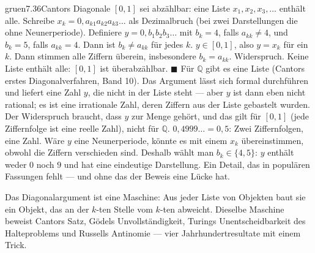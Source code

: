 \begin{loesungkarte}{gruen}{7.36}{Cantors Diagonale}
$[0, 1]$ sei abzählbar: eine Liste $x_1, x_2, x_3, \dots$ enthält alle. Schreibe $x_k = 0{,}a_{k1}a_{k2}a_{k3}\dots$ als Dezimalbruch (bei zwei Darstellungen die ohne Neunerperiode).
Definiere $y = 0{,}b_1b_2b_3\dots$ mit $b_k = 4$, falls $a_{kk}\neq4$, und $b_k = 5$, falls $a_{kk} = 4$. Dann ist $b_k\neq a_{kk}$ für jedes $k$.
$y\in[0, 1]$, also $y = x_k$ für ein $k$. Dann stimmen alle Ziffern überein, insbesondere $b_k = a_{kk}$. Widerspruch. Keine Liste enthält alle: $[0, 1]$ ist überabzählbar. $\blacksquare$
Für $\mathbb Q$ gibt es eine Liste (Cantors erstes Diagonalverfahren, Band 10). Das Argument lässt sich formal durchführen und liefert eine Zahl $y$, die nicht in der Liste steht --- aber $y$ ist dann eben nicht rational; es ist eine irrationale Zahl, deren Ziffern aus der Liste gebastelt wurden. Der Widerspruch braucht, dass $y$ zur Menge gehört, und das gilt für $[0, 1]$ (jede Ziffernfolge ist eine reelle Zahl), nicht für $\mathbb Q$.
$0{,}4999\ldots = 0{,}5$: Zwei Ziffernfolgen, eine Zahl. Wäre $y$ eine Neunerperiode, könnte es mit einem $x_k$ übereinstimmen, obwohl die Ziffern verschieden sind. Deshalb wählt man $b_k\in\{4, 5\}$: $y$ enthält weder $0$ noch $9$ und hat eine eindeutige Darstellung. Ein Detail, das in populären Fassungen fehlt --- und ohne das der Beweis eine Lücke hat.
\begin{mitnehmen}\kastentext
Das Diagonalargument ist eine Maschine: Aus jeder Liste von Objekten baut sie ein Objekt, das an der $k$-ten Stelle vom $k$-ten abweicht. Dieselbe Maschine beweist Cantors Satz, Gödels Unvollständigkeit, Turings Unentscheidbarkeit des Halteproblems und Russells Antinomie --- vier Jahrhundertresultate mit einem Trick.
\end{mitnehmen}
\end{loesungkarte}

